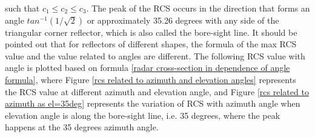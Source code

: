 \documentclass[12pt,DIV14,BCOR12mm,a4paper,footinclude=false,headinclude,parskip=half-,twoside,openright,cleardoublepage=empty,toc=index,bibliography=totoc,listof=totoc]{scrreprt}
\numberwithin{equation}{chapter}
\begin{document}
such that $c_1 \leq c_2 \leq c_3$. The peak of the RCS occurs in the direction that forms an angle $tan^{-1}(1/\sqrt{2})$ or approximately 35.26 degrees with any side of the triangular corner reflector, which is also called the bore-sight line. It should be pointed out that for reflectors of different shapes, the formula of the max RCS value and the value related to angles are different. The following RCS value with angle is plotted based on formula \ref{radar cross-section in dependence of angle formula}, where Figure \ref{rcs related to azimuth and elevation angles} represents the RCS value at different azimuth and elevation angle, and Figure \ref{rcs related to azimuth as el=35deg} represents the variation of RCS with azimuth angle when elevation angle is along the bore-sight line, i.e. 35 degrees, where the peak happens at the 35 degrees azimuth angle.
\end{document}
